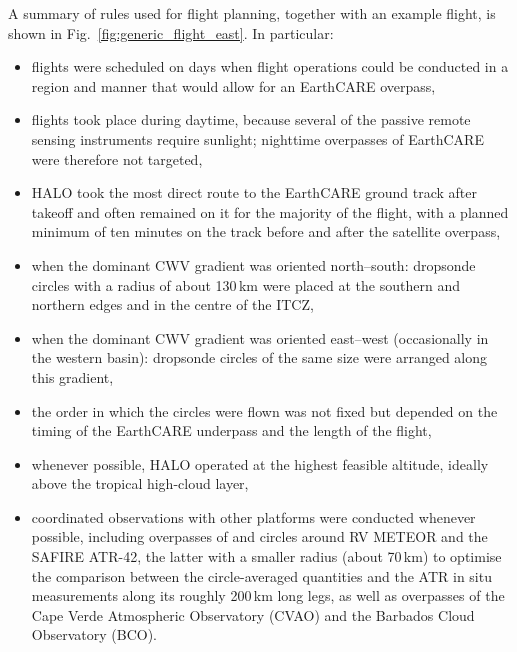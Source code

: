 \documentclass[acp, manuscript]{copernicus}
\begin{document}
A summary of rules used for flight planning, together with an example flight, is shown in Fig.~\ref{fig:generic_flight_east}. 
In particular:
\begin{itemize}
\item flights were scheduled on days when flight operations could be conducted in a region and manner that would allow for an EarthCARE overpass,
\item flights took place during daytime, because several of the passive remote sensing instruments require sunlight; nighttime overpasses of EarthCARE were therefore not targeted,
\item HALO took the most direct route to the EarthCARE ground track after takeoff and often remained on it for the majority of the flight, with a planned minimum of ten minutes on the track before and after the satellite overpass,
\item when the dominant CWV gradient was oriented north--south: dropsonde circles with a radius of about 130\,\unit{km} were placed at the southern and northern edges and in the centre of the ITCZ,
\item when the dominant CWV gradient was oriented east--west (occasionally in the western basin): dropsonde circles of the same size were arranged along this gradient,
\item the order in which the circles were flown was not fixed but depended on the timing of the EarthCARE underpass and the length of the flight,
\item whenever possible, HALO operated at the highest feasible altitude, ideally above the tropical high-cloud layer,
\item coordinated observations with other platforms were conducted whenever possible, including overpasses of and circles around RV METEOR and the SAFIRE ATR-42, the latter with a smaller radius (about 70\,\unit{km}) to optimise the comparison between the circle-averaged quantities and the ATR in situ measurements along its roughly 200\,\unit{km} long legs, as well as overpasses of the Cape Verde Atmospheric Observatory (CVAO) and the Barbados Cloud Observatory (BCO).
\end{itemize}

\end{document}
